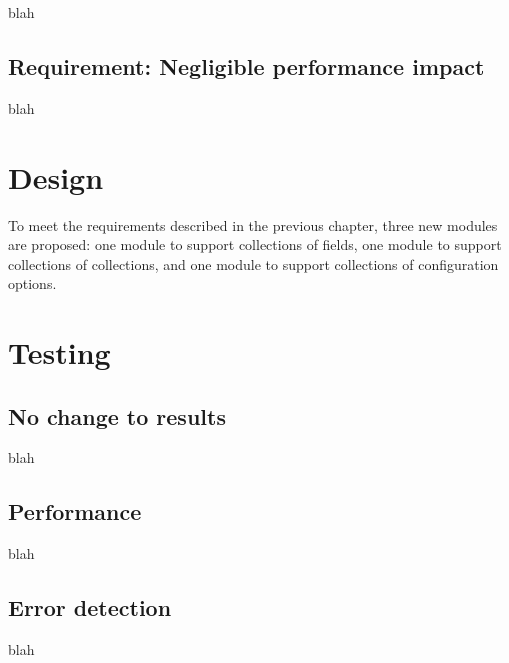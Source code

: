 \documentclass[11pt]{report}
\begin{document}
blah

\section{Requirement: Negligible performance impact}

blah


%
%
\chapter{Design}

To meet the requirements described in the previous chapter, three new modules are proposed: one module to support collections of fields, one module to support collections of collections, and one module to support collections of configuration options.


%
%
\chapter{Testing}

\section{No change to results}

blah

\section{Performance}

blah

\section{Error detection}

blah

\end{document}
